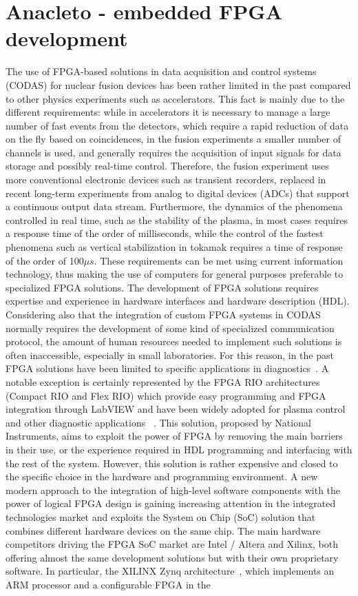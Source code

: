 \section{Anacleto - embedded FPGA development}

The use of FPGA-based solutions in data acquisition and control systems (CODAS) for nuclear fusion devices has been rather limited in the past compared to other physics experiments such as accelerators. This fact is mainly due to the different requirements: while in accelerators it is necessary to manage a large number of fast events from the detectors, which require a rapid reduction of data on the fly based on coincidences, in the fusion experiments a smaller number of channels is used, and generally requires the acquisition of input signals for data storage and possibly real-time control. 
Therefore, the fusion experiment uses more conventional electronic devices such as transient recorders, replaced in recent long-term experiments from analog to digital devices (ADCs) that support a continuous output data stream. Furthermore, the dynamics of the phenomena controlled in real time, such as the stability of the plasma, in most cases requires a response time of the order of milliseconds, while the control of the fastest phenomena such as vertical stabilization in tokamak requires a time of response of the order of 100$\mu s$. These requirements can be met using current information technology, thus making the use of computers for general purposes preferable to specialized FPGA solutions. The development of FPGA solutions requires expertise and experience in hardware interfaces and hardware description (HDL). Considering also that the integration of custom FPGA systems in CODAS normally requires the development of some kind of specialized communication protocol, the amount of human resources needed to implement such solutions is often inaccessible, especially in small laboratories. For this reason, in the past FPGA solutions have been limited to specific applications in diagnostics~\cite{ana_1,ana_2}. A notable exception is certainly represented by the FPGA RIO architectures~\cite{ana_3} (Compact RIO and Flex RIO) which provide easy programming and FPGA integration through LabVIEW and have been widely adopted for plasma control~\cite{ana_4} and other diagnostic applications~\cite{ana_5} . This solution, proposed by National Instruments, aims to exploit the power of FPGA by removing the main barriers in their use, or the experience required in HDL programming and interfacing with the rest of the system. However, this solution is rather expensive and closed to the specific choice in the hardware and programming environment. A new modern approach to the integration of high-level software components with the power of logical FPGA design is gaining increasing attention in the integrated technologies market and exploits the System on Chip (SoC) solution that combines different hardware devices on the same chip. The main hardware competitors driving the FPGA SoC market are Intel / Altera and Xilinx, both offering almost the same development solutions but with their own proprietary software. In particular, the XILINX Zynq architecture~\cite{ana_6}, which implements an ARM processor and a configurable FPGA in the 